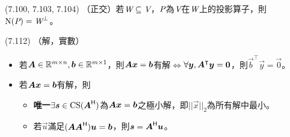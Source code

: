 \item \begin{theorem}{(7.100, 7.103, 7.104)} （正交）若$\spc{W} \subseteq \V$，$\P$為$\V$在$\spc{W}$上的投影算子，則$\Ker(\P) = \spc{W}^{\perp}$。
\end{theorem}

\item \begin{theorem}{(7.112)} （解，實數）
	\begin{itemize}
		\item 若$\mat{A} \in \R^{m \times n}, \vec{b} \in \R^{m \times 1}$，則$\mat{A}\vec{x} = \vec{b}$有解$\iff$$\forall \vec{y}, \mat{A}^\intercal\vec{y} = \vec{0}$，則$\vec{b}^\intercal\vec{y} = \vec{0}$。
		\item 若$\mat{A}\vec{x} = \vec{b}$有解，則
			\begin{itemize}
				\item \textbf{唯一}$\exists \vec{s} \in \cs(\mat{A}\herm)$為$\mat{A}\vec{x} = \vec{b}$之極小解，即$||\vec{x}||_2$為所有解中最小。
				\item 若$\vec{u}$滿足$(\mat{AA}\herm)\vec{u} = \vec{b}$，則$\vec{s} = \mat{A}\herm\vec{u}$。
			\end{itemize}
	\end{itemize}
\end{theorem}

